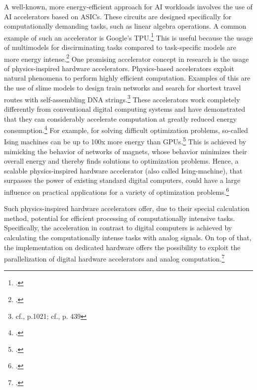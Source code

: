 A well-known, more energy-efficient approach for AI workloads involves the use of AI accelerators based on \ac{ASIC}s.
These circuits are designed specifically for computationally demanding tasks, such as linear algebra operations. A common example of such an accelerator is Google's \ac{TPU}.\footcite[cf.][39]{wittpahlKuenstlicheIntelligenzTechnologie2019} 
This is useful because the usage of multimodels for discirminating tasks compared to
task-specific models are more energy intense.\footcite[cf.][5]{luccioniPowerHungryProcessing2023}
One promising accelerator concept in research is the usage of physics-inspired hardware accelerators.
Physics-based accelerators exploit natural phenomena to perform highly efficient computation.
Examples of this are the use of slime models to design train networks and search for shortest travel routes with self-assembling DNA strings.\footnote{cf.\cite{adlemanMolecularComputationSolutions1994}, p.1021; cf.\cite{teroRulesBiologicallyInspired2010}, p. 439}
These accelerators work completely differently from conventional digital computing systems and have demonstrated that they can considerably accelerate computation at greatly reduced energy consumption.\footcite[cf.][1]{mohseniIsingMachinesHardware2022}
For example, for solving difficult optimization problems, so-called Ising machines can be up to 100x more energy than \ac{GPU}s.\footcite[cf.][409-418]{caiPowerefficientCombinatorialOptimization2020}
This is achieved by mimicking the behavior of networks of magnets, whose behavior minimizes their overall energy and thereby finds solutions to optimization problems.
Hence, a scalable physics-inspired hardware accelerator (also called Ising-machine),
that surpasses the power of existing standard digital computers, could have a large influence
on practical applications for a variety of optimization problems.\footcite[cf.][1]{mohseniIsingMachinesHardware2022}

Such physics-inspired hardware accelerators offer, due to their special calculation method,
potential for efficient processing of computationally intensive tasks. 
Specifically, the acceleration in contrast to digital computers is achieved by calculating
the computationally intense tasks with analog signals.
On top of that, the implementation on dedicated hardware offers the possibility to exploit the parallelization
of digital hardware accelerators and analog computation.\footcite[cf.][4]{mohseniIsingMachinesHardware2022}

